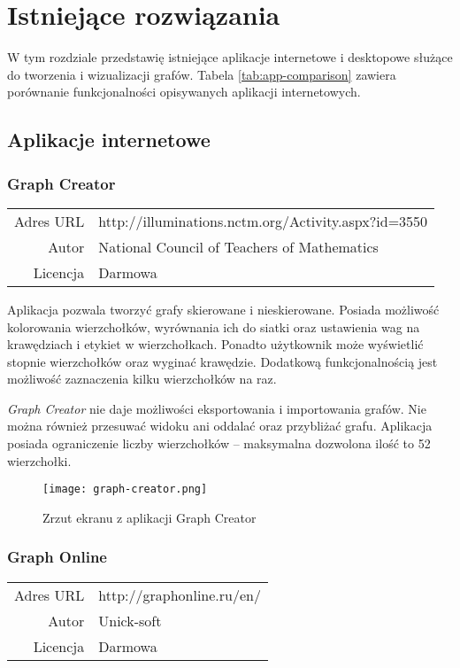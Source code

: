 \chapter{Istniejące rozwiązania}

W tym rozdziale przedstawię istniejące aplikacje internetowe \cite{mathex} i desktopowe służące do tworzenia i wizualizacji grafów. Tabela \ref{tab:app-comparison} zawiera porównanie funkcjonalności opisywanych aplikacji internetowych.

\section{Aplikacje internetowe}

\subsection*{Graph Creator}
\bigskip
\noindent\begin{tabularx}{\textwidth}{r|X|}
\cline{2-2}
  Adres URL & http://illuminations.nctm.org/Activity.aspx?id=3550 \\ 
\cline{2-2}
 Autor & National Council of Teachers of Mathematics \\ 
\cline{2-2}
 Licencja & Darmowa\\  
\cline{2-2}
\end{tabularx} 
\bigskip

Aplikacja pozwala tworzyć grafy skierowane i nieskierowane. Posiada możliwość kolorowania wierzchołków, wyrównania ich do siatki oraz ustawienia wag na krawędziach i etykiet w wierzchołkach. Ponadto użytkownik może wyświetlić stopnie wierzchołków oraz wyginać krawędzie. Dodatkową funkcjonalnością jest możliwość zaznaczenia kilku wierzchołków na raz. 

\textit{Graph Creator} nie daje możliwości eksportowania i importowania grafów. Nie można również przesuwać widoku ani oddalać oraz przybliżać grafu. Aplikacja posiada ograniczenie liczby wierzchołków -- maksymalna dozwolona ilość to 52 wierzchołki.

\begin{figure}[H]
\caption{Zrzut ekranu z aplikacji Graph Creator}
\centering
\texttt{[image: graph-creator.png]}
\end{figure}

\subsection*{Graph Online}
\bigskip
\noindent\begin{tabularx}{\textwidth}{r|X|}
\cline{2-2}
  Adres URL & http://graphonline.ru/en/ \\ 
\cline{2-2}
 Autor & Unick-soft \\ 
\cline{2-2}
 Licencja & Darmowa\\  
\cline{2-2}
\end{tabularx} 
\bigskip

